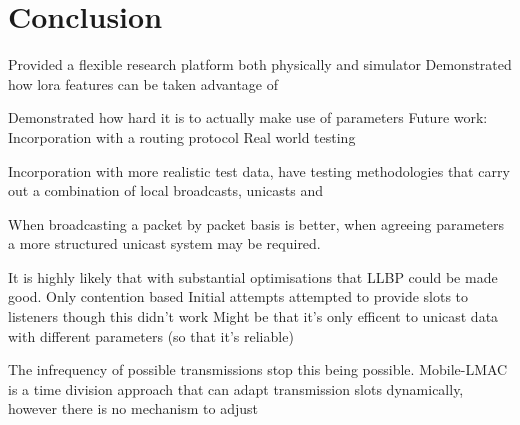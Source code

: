 \chapter{Conclusion}


Provided a flexible research platform both physically and simulator
Demonstrated how lora features can be taken advantage of

Demonstrated how hard it is to actually make use of parameters
Future work:
Incorporation with a routing protocol
Real world testing

Incorporation with more realistic test data, have testing methodologies that carry out a combination of local broadcasts, unicasts and 

When broadcasting a packet by packet basis is better, when agreeing parameters a more structured unicast system may be required.

It is highly likely that with substantial optimisations that LLBP could be made good.
Only contention based 
Initial attempts attempted to provide slots to listeners though this didn't work
Might be that it's only efficent to unicast data with different parameters (so that it's reliable)

The infrequency of possible transmissions stop this being possible.
Mobile-LMAC is a time division approach that can adapt transmission slots dynamically, however there is no mechanism to adjust 

